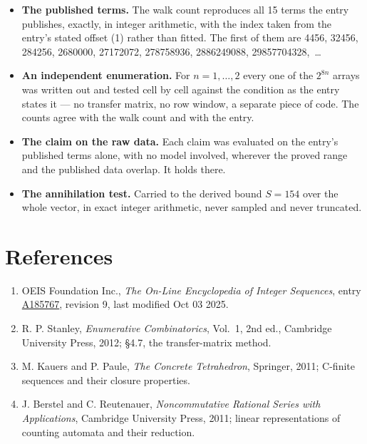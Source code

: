 \documentclass[11pt]{article}
\theoremstyle{definition}
\begin{document}
\begin{itemize}

\item {\bfseries The published terms.} The walk count reproduces all 15 terms the entry publishes, exactly, in integer arithmetic, with the index taken from the entry's stated offset (1) rather than fitted. The first of them are 4456, 32456, 284256, 2680000, 27172072, 278758936, 2886249088, 29857704328,~\dots

\item {\bfseries An independent enumeration.} For $n = 1,\dots,2$ every one of the $2^{8n}$ arrays was written out and tested cell by cell against the condition as the entry states it --- no transfer matrix, no row window, a separate piece of code. The counts agree with the walk count and with the entry.

\item {\bfseries The claim on the raw data.} Each claim was evaluated on the entry's published terms alone, with no model involved, wherever the proved range and the published data overlap. It holds there.

\item {\bfseries The annihilation test.} Carried to the derived bound $S = 154$ over the whole vector, in exact integer arithmetic, never sampled and never truncated.

\end{itemize}

\section{References}

\begin{enumerate}

\item OEIS Foundation Inc., \emph{The On-Line Encyclopedia of Integer Sequences}, entry \href{https://oeis.org/A185767}{A185767}, revision 9, last modified Oct 03 2025.

\item R. P. Stanley, \emph{Enumerative Combinatorics}, Vol.~1, 2nd ed., Cambridge University Press, 2012; \S4.7, the transfer-matrix method.

\item M. Kauers and P. Paule, \emph{The Concrete Tetrahedron}, Springer, 2011; C-finite sequences and their closure properties.

\item J. Berstel and C. Reutenauer, \emph{Noncommutative Rational Series with Applications}, Cambridge University Press, 2011; linear representations of counting automata and their reduction.

\end{enumerate}
\end{document}
